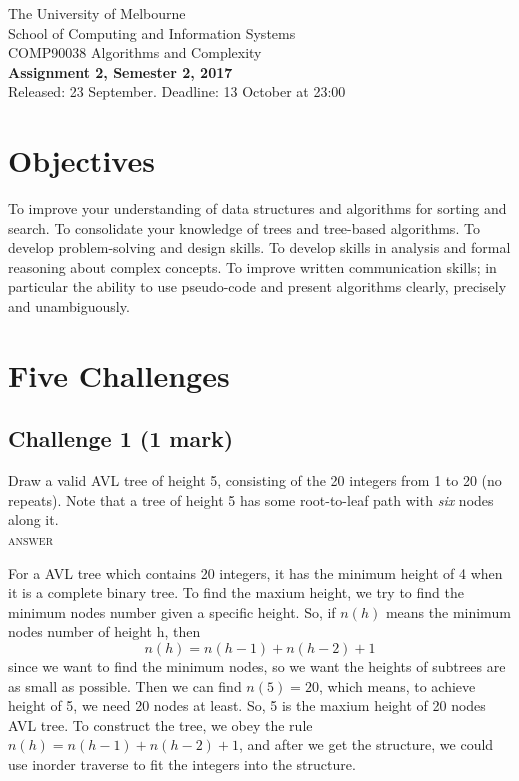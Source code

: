 \documentclass[11pt]{article}
\begin{document}
\begin{center}
{\sc The University of Melbourne
\\
School of Computing and Information Systems
\\
COMP90038 Algorithms and Complexity}
\bigskip \\
{\Large\bf Assignment 2, Semester 2, 2017}
\bigskip \\
{\large Released: 23 September.  Deadline: 13 October at 23:00}
\end{center}

\section*{Objectives}

To improve your understanding of data structures and algorithms for
sorting and search.
To consolidate your knowledge of trees and tree-based algorithms.
To develop problem-solving and design skills.
To develop skills in analysis and formal reasoning about
complex concepts.
To improve written communication skills; in particular the
ability to use pseudo-code and present algorithms clearly,
precisely and unambiguously.

\section*{Five Challenges}

\subsection*{Challenge 1 \hfill {\small (1 mark)}}

Draw a valid AVL tree of height 5, consisting of the 20 integers
from 1 to 20 (no repeats).
Note that a tree of height 5 has some root-to-leaf path with
\emph{six} nodes along it.
\\
\textsc{answer}
\begin{center}
\end{center}
For a AVL tree which contains 20 integers, it has the minimum height of 4
when it is a complete binary tree. To find the maxium height,
we try to find the minimum nodes number given a specific height.
So, if $n(h)$ means the minimum nodes number of height h, then
$$n(h) = n(h-1) + n(h-2) + 1$$
since we want to find the minimum nodes, so we want the heights of subtrees
are as small as possible.
Then we can find $n(5) = 20$, which means, to achieve height of 5,
we need 20 nodes at least.
So, 5 is the maxium height of 20 nodes AVL tree.
To construct the tree, we obey the rule $n(h) = n(h-1) + n(h-2) + 1$,
and after we get the structure,
we could use inorder traverse to fit the integers into the structure.
\pagebreak
\end{document}
